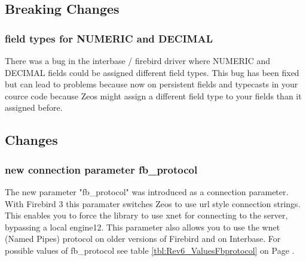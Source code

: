 \documentclass[a4paper,12pt,oneside]{book}
\begin{document}
\subsection{Breaking Changes}
\label{sec:Rev6_FirebirdInterbase_BreakingChanges}

\subsubsection{field types for NUMERIC and DECIMAL}
\label{sec:Rev6_FirebirdInterbase_BreakingChanges_FieldTypesNumericDecimal}

There was a bug in the interbase / firebird driver where NUMERIC and DECIMAL fields could be assigned different field types.
This bug has been fixed but can lead to problems because now on persistent fields and typecasts in your cource code because Zeos might assign a different field type to your fields than it assigned before.

\subsection{Changes}
\label{sec:Rev6_FirebirdInterbase_Changes}

\subsubsection{new connection parameter fb\_protocol}
\label{sec:Rev6_FirebirdInterbase_Changes_FBProtocol}

The new parameter "fb\_protocol" was introduced as a connection parameter.
With Firebird 3 this paramater switches Zeos to use url style connection strings.
This enables you to force the library to use xnet for connecting to the server, bypassing a local engine12.
This parameter also allows you to use the wnet (Named Pipes) protocol on older versions of Firebird and on Interbase.
For possible values of fb\_protocol see table \ref{tbl:Rev6_ValuesFbprotocol} on Page \pageref{tbl:Rev6_ValuesFbprotocol}.
\end{document}
